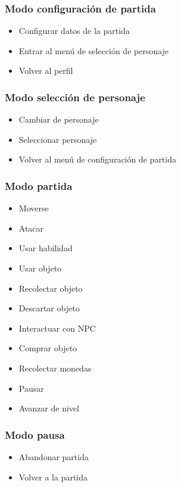 \subsubsection{Modo configuración de partida}
\begin{itemize}
    \item Configurar datos de la partida
    \item Entrar al menú de selección de personaje
    \item Volver al perfil
\end{itemize}

\subsubsection{Modo selección de personaje}
\begin{itemize}
    \item Cambiar de personaje
    \item Seleccionar personaje
    \item Volver al menú de configuración de partida
\end{itemize}

\subsubsection{Modo partida}

\begin{itemize}
    \item Moverse
    \item Atacar
    \item Usar habilidad
    \item Usar objeto
    \item Recolectar objeto
    \item Descartar objeto
    \item Interactuar con NPC
    \item Comprar objeto
    \item Recolectar monedas
    \item Pausar
    \item Avanzar de nivel
\end{itemize}

\subsubsection{Modo pausa}
\begin{itemize}
    \item Abandonar partida
    \item Volver a la partida
\end{itemize}

